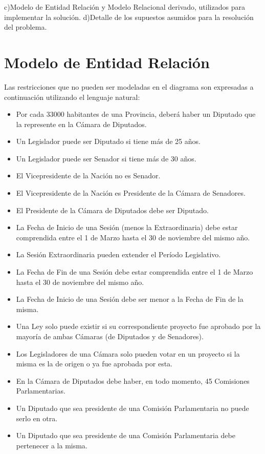 c)Modelo de Entidad Relación y Modelo Relacional derivado, utilizados para implementar la solución.
d)Detalle de los supuestos asumidos para la resolución del problema.


\section{Modelo de Entidad Relación}
Las restricciones que no pueden ser modeladas en el diagrama son expresadas a continuación utilizando el lenguaje natural:
\begin{itemize}
	\item Por cada 33000 habitantes de una Provincia, deberá haber un Diputado que la represente en la Cámara de Diputados. 
	\item Un Legislador puede ser Diputado si tiene más de 25 años.
	\item Un Legislador puede ser Senador si tiene más de 30 años.
	\item El Vicepresidente de la Nación no es Senador.
	\item El Vicepresidente de la Nación es Presidente de la Cámara de Senadores. 
	\item El Presidente de la Cámara de Diputados debe ser Diputado. 
	\item La Fecha de Inicio de una Sesión (menos la Extraordinaria) debe estar comprendida entre el 1 de Marzo hasta el 30 de noviembre del mismo año.	
	\item La Sesión Extraordinaria pueden extender el Período Legislativo. 
	\item La Fecha de Fin de una Sesión debe estar comprendida entre el 1 de Marzo hasta el 30 de noviembre del mismo año.
	\item La Fecha de Inicio de una Sesión debe ser menor a la Fecha de Fin de la misma. 
	\item Una Ley solo puede existir si su correspondiente proyecto fue aprobado por la mayoría de ambas Cámaras (de Diputados y de Senadores).
	\item Los Legisladores de una Cámara solo pueden votar en un proyecto si la misma es la de origen o ya fue aprobada por esta.
	\item En la Cámara de Diputados debe haber, en todo momento, 45 Comisiones Parlamentarias.
	\item Un Diputado que sea presidente de una Comisión Parlamentaria no puede serlo en otra.   
	\item Un Diputado que sea presidente de una Comisión Parlamentaria debe pertenecer a la misma. 

\end{itemize}
